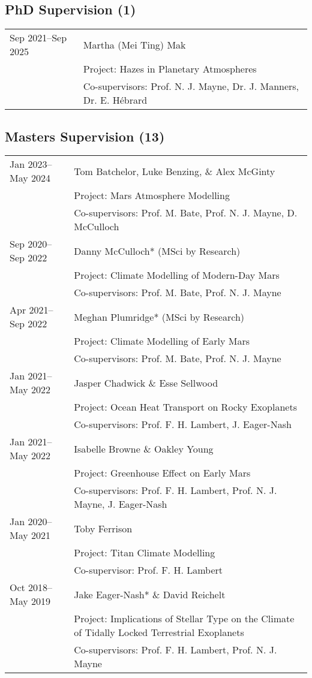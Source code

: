 \documentclass[a4paper, 11pt]{article}
\begin{document}
\subsection*{PhD Supervision (1)}
\begin{tabularx}{\linewidth}{@{}l X@{}}
Sep 2021--Sep 2025 & Martha (Mei Ting) Mak \\
                  & Project: Hazes in Planetary Atmospheres \\
                  & Co-supervisors: Prof. N. J. Mayne, Dr. J. Manners, Dr. E. Hébrard \\
\end{tabularx}

\subsection*{Masters Supervision (13)}
\begin{tabularx}{\linewidth}{@{}l X@{}}
Jan 2023--May 2024 & Tom Batchelor, Luke Benzing, \& Alex McGinty \\
                  & Project: Mars Atmosphere Modelling \\
                  & Co-supervisors: Prof. M. Bate, Prof. N. J. Mayne, D. McCulloch \\
Sep 2020--Sep 2022 & Danny McCulloch* (MSci by Research) \\
                  & Project: Climate Modelling of Modern-Day Mars \\
                  & Co-supervisors: Prof. M. Bate, Prof. N. J. Mayne \\
Apr 2021--Sep 2022 & Meghan Plumridge* (MSci by Research) \\
                  & Project: Climate Modelling of Early Mars \\
                  & Co-supervisors: Prof. M. Bate, Prof. N. J. Mayne \\
Jan 2021--May 2022 & Jasper Chadwick \& Esse Sellwood \\
                  & Project: Ocean Heat Transport on Rocky Exoplanets \\
                  & Co-supervisors: Prof. F. H. Lambert, J. Eager-Nash \\
Jan 2021--May 2022 & Isabelle Browne \& Oakley Young \\
                  & Project: Greenhouse Effect on Early Mars \\
                  & Co-supervisors: Prof. F. H. Lambert, Prof. N. J. Mayne, J. Eager-Nash \\
Jan 2020--May 2021 & Toby Ferrison \\
                  & Project: Titan Climate Modelling \\
                  & Co-supervisor: Prof. F. H. Lambert \\
Oct 2018--May 2019 & Jake Eager-Nash* \& David Reichelt \\
                  & Project: Implications of Stellar Type on the Climate of Tidally Locked Terrestrial Exoplanets \\
                  & Co-supervisors: Prof. F. H. Lambert, Prof. N. J. Mayne \\
\end{tabularx}
\end{document}
